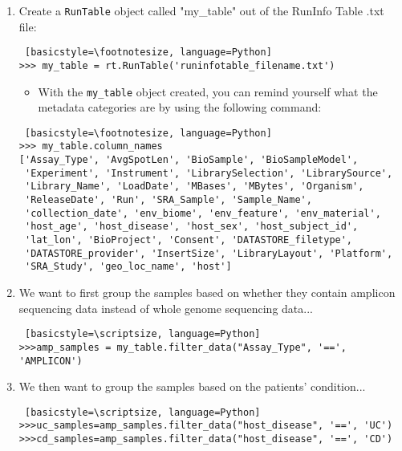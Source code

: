 \begin{enumerate}
            \item Create a \verb|RunTable| object called "my\_table" out of the RunInfo Table .txt file:
            \begin{lstlisting} [basicstyle=\footnotesize, language=Python]
>>> my_table = rt.RunTable('runinfotable_filename.txt')
            \end{lstlisting}
            
            
                \begin{itemize}
                \item With the \verb|my_table| object created, you can remind yourself what the metadata categories are by using the following command:
                \end{itemize}
                \begin{lstlisting} [basicstyle=\footnotesize, language=Python]
>>> my_table.column_names
['Assay_Type', 'AvgSpotLen', 'BioSample', 'BioSampleModel', 
 'Experiment', 'Instrument', 'LibrarySelection', 'LibrarySource', 
 'Library_Name', 'LoadDate', 'MBases', 'MBytes', 'Organism', 
 'ReleaseDate', 'Run', 'SRA_Sample', 'Sample_Name', 
 'collection_date', 'env_biome', 'env_feature', 'env_material', 
 'host_age', 'host_disease', 'host_sex', 'host_subject_id', 
 'lat_lon', 'BioProject', 'Consent', 'DATASTORE_filetype', 
 'DATASTORE_provider', 'InsertSize', 'LibraryLayout', 'Platform', 
 'SRA_Study', 'geo_loc_name', 'host']
                \end{lstlisting}
                
                
            \item We want to first group the samples based on whether they contain amplicon sequencing data instead of whole genome sequencing data...
             \begin{lstlisting} [basicstyle=\scriptsize, language=Python]
>>>amp_samples = my_table.filter_data("Assay_Type", '==', 'AMPLICON')
            \end{lstlisting}
            
            \item We then want to group the samples based on the patients' condition...
            \begin{lstlisting} [basicstyle=\scriptsize, language=Python]
>>>uc_samples=amp_samples.filter_data("host_disease", '==', 'UC')
>>>cd_samples=amp_samples.filter_data("host_disease", '==', 'CD')
            \end{lstlisting}
            

\end{enumerate}
